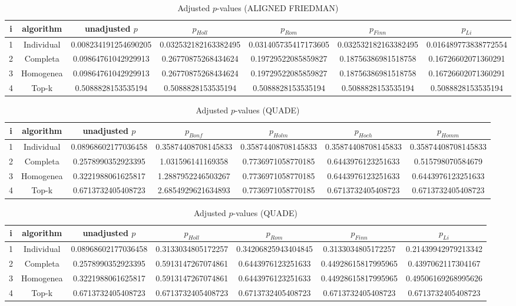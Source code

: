 \documentclass[a4paper,10pt]{article}
\begin{document}
\begin{landscape}
\begin{table}[!htp]
\centering\scriptsize
\caption{Adjusted $p$-values (ALIGNED FRIEDMAN)}
\begin{tabular}{ccccccc}
i&algorithm&unadjusted $p$&$p_{Holl}$&$p_{Rom}$&$p_{Finn}$&$p_{Li}$\\
\hline
1&Individual&0.008234191254690205&0.032532182163382495&0.031405735417173605&0.032532182163382495&0.016489773838772554\\
2&Completa&0.09864761042929913&0.26770875268434624&0.19729522085859827&0.18756386981518758&0.16726602071360291\\
3&Homogenea&0.09864761042929913&0.26770875268434624&0.19729522085859827&0.18756386981518758&0.16726602071360291\\
4&Top-k&0.5088828153535194&0.5088828153535194&0.5088828153535194&0.5088828153535194&0.5088828153535194\\
\hline
\end{tabular}
\end{table}


\newpage

\begin{table}[!htp]
\centering\scriptsize
\caption{Adjusted $p$-values (QUADE)}
\begin{tabular}{ccccccc}
i&algorithm&unadjusted $p$&$p_{Bonf}$&$p_{Holm}$&$p_{Hoch}$&$p_{Homm}$\\
\hline
1&Individual&0.08968602177036458&0.35874408708145833&0.35874408708145833&0.35874408708145833&0.35874408708145833\\
2&Completa&0.2578990352923395&1.031596141169358&0.7736971058770185&0.6443976123251633&0.515798070584679\\
3&Homogenea&0.3221988061625817&1.2887952246503267&0.7736971058770185&0.6443976123251633&0.6443976123251633\\
4&Top-k&0.6713732405408723&2.6854929621634893&0.7736971058770185&0.6713732405408723&0.6713732405408723\\
\hline
\end{tabular}
\end{table}

\begin{table}[!htp]
\centering\scriptsize
\caption{Adjusted $p$-values (QUADE)}
\begin{tabular}{ccccccc}
i&algorithm&unadjusted $p$&$p_{Holl}$&$p_{Rom}$&$p_{Finn}$&$p_{Li}$\\
\hline
1&Individual&0.08968602177036458&0.3133034805172257&0.34206825943404845&0.3133034805172257&0.21439942979213342\\
2&Completa&0.2578990352923395&0.5913147267074861&0.6443976123251633&0.44928615817995965&0.4397062117304167\\
3&Homogenea&0.3221988061625817&0.5913147267074861&0.6443976123251633&0.44928615817995965&0.49506169268995626\\
4&Top-k&0.6713732405408723&0.6713732405408723&0.6713732405408723&0.6713732405408723&0.6713732405408723\\
\hline
\end{tabular}
\end{table}

\end{landscape}
\end{document}
